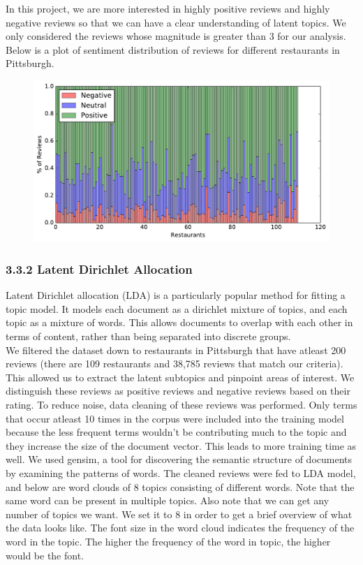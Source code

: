 \documentclass{neu_handout}
\begin{document}
In this project, we are more interested in highly positive reviews and highly negative reviews so that we can have a clear understanding of latent topics. We only considered the reviews whose magnitude is greater than 3 for our analysis. Below is a plot of sentiment distribution of reviews for different restaurants in Pittsburgh.

\begin{figure}[h]
\centering
{
\includegraphics[width=0.5\linewidth]{review_analysis}
}
\end{figure}


\subsubsection*{3.3.2 Latent Dirichlet Allocation}
Latent Dirichlet allocation (LDA) is a particularly popular method for fitting a topic model. It models each document as a dirichlet mixture of topics, and each topic as a mixture of words. This allows documents to overlap with each other in terms of content, rather than being separated into discrete groups.\\

We filtered the dataset down to restaurants in Pittsburgh that have atleast 200 reviews (there are 109 restaurants and 38,785 reviews that match our criteria). This allowed us to extract the latent subtopics and pinpoint areas of interest. We distinguish these reviews as positive reviews and negative reviews based on their rating. To reduce noise, data cleaning of these reviews was performed. Only terms that occur atleast 10 times in the corpus were included into the training model because the less frequent terms wouldn't be contributing much to the topic and they increase the size of the document vector. This leads to more training time as well. We used gensim, a tool for discovering the semantic structure of documents by examining the patterns of words. The cleaned reviews were fed to LDA model, and below are word clouds of 8 topics consisting of different words. Note that the same word can be present in multiple topics. Also note that we can get any number of topics we want. We set it to 8 in order to get a brief overview of what the data looks like. The font size in the word cloud indicates the frequency of the word in the topic. The higher the frequency of the word in topic, the higher would be the font.
\end{document}
